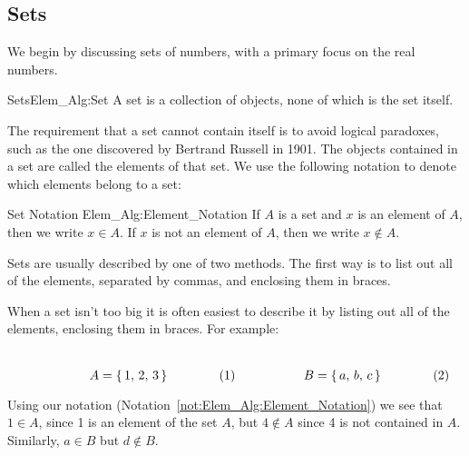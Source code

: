 \documentclass[crop=false,class=book,oneside]{standalone}
\begin{document}
        \subsection{Sets}
            We begin by discussing sets of numbers,
            with a primary focus on the real numbers.
            \begin{fdefinition}{Sets}{Elem_Alg:Set}
                A set is a collection of objects,
                none of which is the set itself.
            \end{fdefinition}
            The requirement that a set cannot contain itself
            is to avoid logical paradoxes, such as the one
            discovered by  Bertrand Russell in 1901. The
            objects contained in a set are called the elements of
            that set. We use the following notation to denote
            which elements belong to a set:
            \begin{fnotation}{Set Notation}
                  {Elem_Alg:Element_Notation}
                If $A$ is a set and $x$ is an element
                of $A$, then we write $x\in{A}$.
                If $x$ is not an element of $A$,
                then we write $x\notin{A}$.
            \end{fnotation}
            Sets are usually described by one of
            two methods. The first way is to list out
            all of the elements, separated by commas,
            and enclosing them in braces.
            \begin{lexample}
                When a set isn't too big it is
                often easiest to describe it by
                listing out all of the elements, enclosing
                them in braces. For example:
                \par
                \begin{subequations}
                    \begin{minipage}{0.49\textwidth}
                        \centering
                        \begin{equation}
                            A=\{\,1,\,2,\,3\,\}
                        \end{equation}
                    \end{minipage}
                    \hfill
                    \begin{minipage}{0.49\textwidth}
                        \centering
                        \begin{equation}
                            B=\{\,a,\,b,\,c\,\}
                        \end{equation}
                    \end{minipage}
                \end{subequations}
                \par\hfill\par
                Using our notation
                (Notation~\ref{not:Elem_Alg:Element_Notation})
                we see that $1\in{A}$, since 1 is an element
                of the set $A$, but $4\notin{A}$ since 4 is
                not contained in $A$. Similarly, $a\in{B}$
                but $d\notin{B}$.
            \end{lexample}
\end{document}
